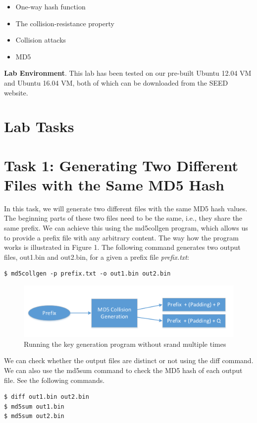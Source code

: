 \documentclass[12pt]{article}
\begin{document}
    \begin{itemize}
        \item One-way hash function
        \item The collision-resistance property
        \item Collision attacks
        \item MD5
    \end{itemize}

\textbf{Lab Environment}. This lab has been tested on our pre-built Ubuntu 12.04 VM and Ubuntu 16.04 VM, both of which
can be downloaded from the SEED website.

\clearpage
\section{Lab Tasks}
\section{Task 1: Generating Two Different Files with the Same MD5 Hash}
In this task, we will generate two different files with the same MD5 hash values. The beginning parts of these
two files need to be the same, i.e., they share the same prefix. We can achieve this using the md5collgen
program, which allows us to provide a prefix file with any arbitrary content. The way how the program works
is illustrated in Figure 1. The following command generates two output files, out1.bin and out2.bin,
for a given a prefix file \emph{prefix.txt}:

\begin{verbatim}
$ md5collgen -p prefix.txt -o out1.bin out2.bin
\end{verbatim}

\begin{figure}[H]
	\begin{center}
		\includegraphics[scale=0.6]{pics/i1.png}
	\end{center}{}
	\caption{Running the key generation program without srand multiple times}
	\label{fig:i1}
\end{figure}

We can check whether the output files are distinct or not using the diff command. We can also use the
md5sum command to check the MD5 hash of each output file. See the following commands.
\begin{verbatim}
$ diff out1.bin out2.bin
$ md5sum out1.bin
$ md5sum out2.bin
\end{verbatim}
\end{document}
